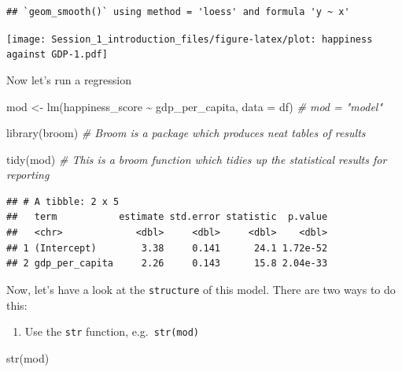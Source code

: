 \documentclass[]{article}
\newenvironment{Shaded}{\begin{snugshade}}{\end{snugshade}}
\newcommand{\AttributeTok}[1]{\textcolor[rgb]{0.77,0.63,0.00}{#1}}
\newcommand{\CommentTok}[1]{\textcolor[rgb]{0.56,0.35,0.01}{\textit{#1}}}
\newcommand{\FunctionTok}[1]{\textcolor[rgb]{0.00,0.00,0.00}{#1}}
\newcommand{\NormalTok}[1]{#1}
\newcommand{\OtherTok}[1]{\textcolor[rgb]{0.56,0.35,0.01}{#1}}
\newcommand{\SpecialCharTok}[1]{\textcolor[rgb]{0.00,0.00,0.00}{#1}}
\providecommand{\tightlist}{%
  \setlength{\itemsep}{0pt}\setlength{\parskip}{0pt}}
\begin{document}
\begin{verbatim}
## `geom_smooth()` using method = 'loess' and formula 'y ~ x'
\end{verbatim}

\texttt{[image: Session\_1\_introduction\_files/figure-latex/plot: happiness against GDP-1.pdf]}

Now let's run a regression

\begin{Shaded}
\begin{Highlighting}[]
\NormalTok{mod }\OtherTok{\textless{}{-}} \FunctionTok{lm}\NormalTok{(happiness\_score }\SpecialCharTok{\textasciitilde{}}\NormalTok{ gdp\_per\_capita, }\AttributeTok{data =}\NormalTok{ df) }\CommentTok{\# mod = "model"}

\FunctionTok{library}\NormalTok{(broom) }\CommentTok{\# Broom is a package which produces neat tables of results}

\FunctionTok{tidy}\NormalTok{(mod) }\CommentTok{\# This is a broom function which tidies up the statistical results for reporting}
\end{Highlighting}
\end{Shaded}

\begin{verbatim}
## # A tibble: 2 x 5
##   term           estimate std.error statistic  p.value
##   <chr>             <dbl>     <dbl>     <dbl>    <dbl>
## 1 (Intercept)        3.38     0.141      24.1 1.72e-52
## 2 gdp_per_capita     2.26     0.143      15.8 2.04e-33
\end{verbatim}

Now, let's have a look at the \texttt{structure} of this model. There
are two ways to do this:

\begin{enumerate}
\def\labelenumi{\arabic{enumi}.}
\tightlist
\item
  Use the \texttt{str} function, e.g.~\texttt{str(mod)}
\end{enumerate}

\begin{Shaded}
\begin{Highlighting}[]
\FunctionTok{str}\NormalTok{(mod)}
\end{Highlighting}
\end{Shaded}
\end{document}
